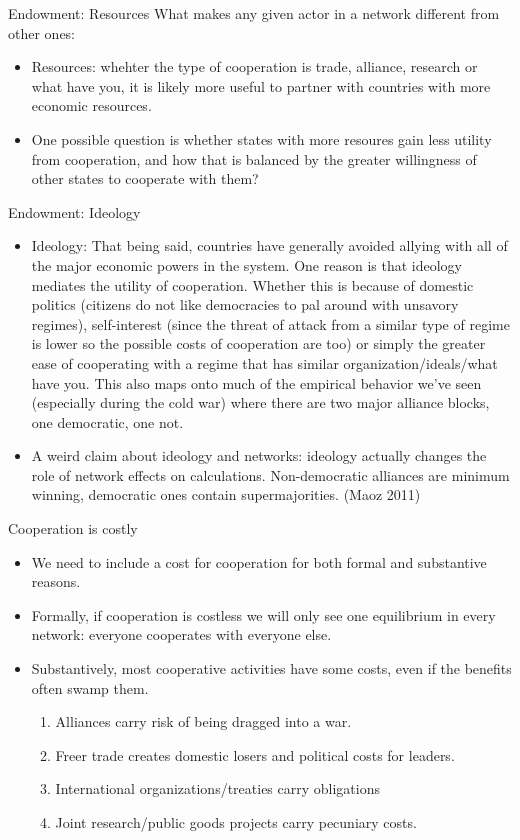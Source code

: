 \documentclass{beamer}
\begin{document}
\begin{frame}{Endowment: Resources}
What makes any given actor in a network different from other ones:
\begin{itemize}
\item Resources: whehter the type of cooperation is trade, alliance, research or what have you, it is likely more useful to partner with countries with more economic resources.
\item One possible question is whether states with more resoures gain less utility from cooperation, and how that is balanced by the greater willingness of other states to cooperate with them? 
\end{itemize}
\end{frame}

\begin{frame}{Endowment: Ideology}
\begin{itemize}
\item Ideology: That being said, countries have generally avoided allying with all of the major economic powers in the system. One reason is that ideology mediates the utility of cooperation. Whether this is because of domestic politics (citizens do not like democracies to pal around with unsavory regimes), self-interest (since the threat of attack from a similar type of regime is lower so the possible costs of cooperation are too) or simply the greater ease of cooperating with a regime that has similar organization/ideals/what have you. This also maps onto much of the empirical behavior we've seen (especially during the cold war) where there are two major alliance blocks, one democratic, one not.
\item A weird claim about ideology and networks: ideology actually changes the role of network effects on calculations. Non-democratic alliances are minimum winning, democratic ones contain supermajorities. (Maoz 2011)
\end{itemize}
\end{frame}

\begin{frame}{Cooperation is costly}
\begin{itemize}
\item We need to include a cost for cooperation for both formal and substantive reasons.
\item Formally, if cooperation is costless we will only see one equilibrium in every network: everyone cooperates with everyone else.
\item Substantively, most cooperative activities have some costs, even if the benefits often swamp them.
\begin{enumerate}
\item Alliances carry risk of being dragged into a war.
\item Freer trade creates domestic losers and political costs for leaders.
\item International organizations/treaties carry obligations
\item Joint research/public goods projects carry pecuniary costs.
\end{enumerate}
\end{itemize}
\end{frame}
\end{document}
